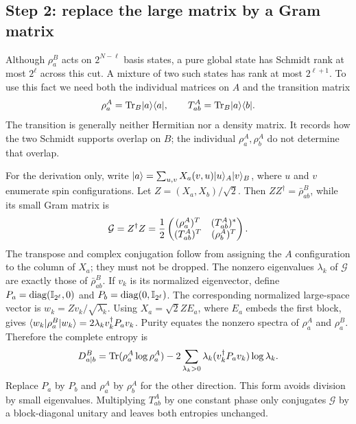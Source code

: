 \subsection{Step 2: replace the large matrix by a Gram matrix}
\label{sec:complement-gram}
Although $\rho_a^B$ acts on $2^{N-\ell}$ basis states, a pure global
state has Schmidt rank at most $2^\ell$ across this cut. A mixture of
two such states has rank at most $2^{\ell+1}$. To use this fact we need
both the individual matrices on $A$ and the transition matrix
\begin{equation}
 \rho_a^A=\operatorname{Tr}_B\lvert a\rangle\langle a\rvert,\qquad
 T_{ab}^A=\operatorname{Tr}_B\lvert a\rangle\langle b\rvert .
 \label{eq:complement-transition}
\end{equation}
The transition is generally neither Hermitian nor a density matrix.
It records how the two Schmidt supports overlap on $B$; the individual
$\rho_a^A,\rho_b^A$ do not determine that overlap.

For the derivation only, write
$\lvert a\rangle=\sum_{u,v}X_a(v,u)\lvert u\rangle_A\lvert v\rangle_B$,
where $u$ and $v$ enumerate spin configurations.
Let $Z=(X_a,X_b)/\sqrt2$. Then
$ZZ^\dagger=\bar\rho_{ab}^B$, while its small Gram matrix is
\begin{equation}
 {\cal G}=Z^\dagger Z
 =\frac12\begin{pmatrix}
  (\rho_a^A)^T &(T_{ab}^A)^*\\
  (T_{ab}^A)^T&(\rho_b^A)^T
 \end{pmatrix}.
 \label{eq:complement-gram}
\end{equation}
The transpose and complex conjugation follow from assigning the $A$
configuration to the column of $X_a$; they must not be dropped.
The nonzero eigenvalues $\lambda_k$ of $\mathcal G$ are exactly those
of $\bar\rho_{ab}^B$. If $v_k$ is its normalized eigenvector, define
$P_a=\operatorname{diag}(\mathbb I_{2^\ell},0)$ and
$P_b=\operatorname{diag}(0,\mathbb I_{2^\ell})$.
The corresponding normalized large-space vector is
$w_k=Zv_k/\sqrt{\lambda_k}$.
Using $X_a=\sqrt2 ZE_a$, where $E_a$ embeds the first block, gives
$\langle w_k\rvert\rho_a^B\lvert w_k\rangle=2\lambda_k v_k^\dagger P_a v_k$.
Purity equates the nonzero spectra of $\rho_a^A$ and $\rho_a^B$.
Therefore the complete entropy is
\begin{equation}
 D^B_{a\mid b}
 =\operatorname{Tr}(\rho_a^A\log\rho_a^A)
   -2\sum_{\lambda_k>0}\lambda_k
       (v_k^\dagger P_a v_k)\log\lambda_k .
 \label{eq:complement-entropy}
\end{equation}
Replace $P_a$ by $P_b$ and $\rho_a^A$ by $\rho_b^A$ for the other
direction. This form avoids division by small eigenvalues.
Multiplying $T_{ab}^A$ by one constant phase only conjugates
$\mathcal G$ by a block-diagonal unitary and leaves both entropies unchanged.

